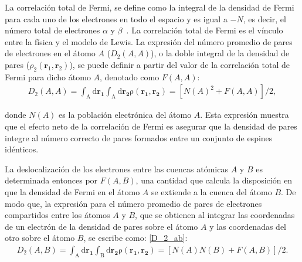 La correlación total de Fermi, se define como la integral de la densidad de
Fermi para cada uno de los electrones en todo el espacio y es igual a $-N$, es
decir, el número total de electrones $\alpha$ y $\beta$~\cite{Fradera1999}.  La
correlación total de Fermi es el vínculo entre la física y el modelo de Lewis.
La expresión del número promedio de pares de electrones en el átomo $A$
($D_{2}(A,A)$), o la doble integral de la densidad de pares ($\rho_{2}
(\mathbf{r}_{1}, \mathbf{r}_{2})$), se puede definir a partir del valor de la
correlación total de Fermi para dicho átomo $A$, denotado como $F(A,A)$:
%
%
\begin{align}
  D_{2}(A,A)=\mathrm{\int_{A}d\mathbf{r_1}\int_{A}d\mathbf{r_2}\rho(\mathbf{r_{1},r_{2}}) }=
  [N(A)^2 + F(A,A)]/2 ,
  \label{D_2_aa}
\end{align}

\noindent donde $N (A)$ es la población electrónica del átomo $A$. Esta
expresión muestra que el efecto neto de la correlación de Fermi es asegurar que
la densidad de pares integre al número correcto de pares formados entre un
conjunto de espines idénticos.

La deslocalización de los electrones entre las cuencas atómicas $A$ y $B$ es
determinada entonces por $F(A, B)$, una cantidad que calcula la disposición en
que la densidad de Fermi en el átomo $A$ se extiende a la cuenca del átomo $B$.
De modo que, la expresión para el número promedio de pares de electrones
compartidos entre los átomos $A$ y $B$, que se obtienen al integrar las
coordenadas de un electrón de la densidad de pares sobre el átomo $A$ y las
coordenadas del otro sobre el átomo $B$, se escribe como:%
\ref{D_2_ab}:
%
\begin{align}
  D_{2}(A,B)=\mathrm{\int_{A}d\mathbf{r_1}\int_{B}d\mathbf{r_2}\rho(\mathbf{r_{1},r_{2}}) }=
  [N(A)N(B) + F(A,B)]/2.
  \label{D_2_ab}
\end{align}


